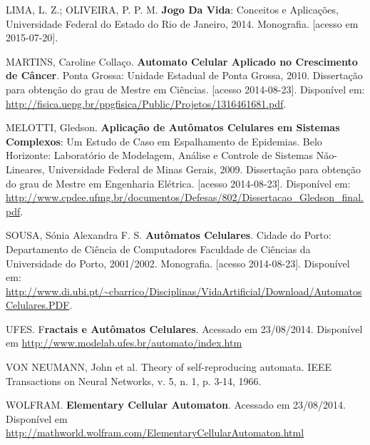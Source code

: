 \documentclass[compress, hide notes]{beamer}
\begin{document}
	\begin{thebibliography}{100}
	
    	 LIMA, L. Z.; OLIVEIRA, P. P. M. \textbf{Jogo Da Vida}: Conceitos e Aplicações, Universidade Federal do Estado do Rio de Janeiro, 2014. Monografia. [acesso em 2015-07-20].
    
    	 MARTINS, Caroline Collaço. \textbf{Automato Celular Aplicado no Crescimento de Câncer}. Ponta Grossa: Unidade Estadual de Ponta Grossa, 2010. Dissertação para obtenção do grau de Mestre em Ciências. [acesso 2014-08-23]. Disponível em: \url{http://fisica.uepg.br/ppgfisica/Public/Projetos/1316461681.pdf}.
    
		 MELOTTI, Gledson. \textbf{Aplicação de Autômatos Celulares em
		Sistemas Complexos}: Um Estudo de Caso em Espalhamento de Epidemias. Belo Horizonte: Laboratório de Modelagem, Análise e Controle de Sistemas Não-Lineares, Universidade Federal de Minas Gerais, 2009. Dissertação para obtenção do grau de Mestre em Engenharia Elétrica. [acesso 2014-08-23]. Disponível em: \url{http://www.cpdee.ufmg.br/documentos/Defesas/802/Dissertacao_Gledson_final.pdf}.

		 SOUSA, Sónia Alexandra F. S. \textbf{Autômatos Celulares}. Cidade do Porto: Departamento de Ciência de Computadores	Faculdade de Ciências da Universidade do Porto, 2001/2002. Monografia. [acesso 2014-08-23]. Disponível em: \url{http://www.di.ubi.pt/~cbarrico/Disciplinas/VidaArtificial/Download/AutomatosCelulares.PDF}.
		
		 UFES. F\textbf{ractais e Autômatos Celulares}. Acessado em 23/08/2014. Disponível em \url{http://www.modelab.ufes.br/automato/index.htm}
	
    	 VON NEUMANN, John et al. Theory of self-reproducing automata. IEEE Transactions on Neural Networks, v. 5, n. 1, p. 3-14, 1966.
        
         WOLFRAM. \textbf{Elementary Cellular Automaton}. Acessado em 23/08/2014. Disponível em \url{http://mathworld.wolfram.com/ElementaryCellularAutomaton.html}
	
	\end{thebibliography}
\end{document}
